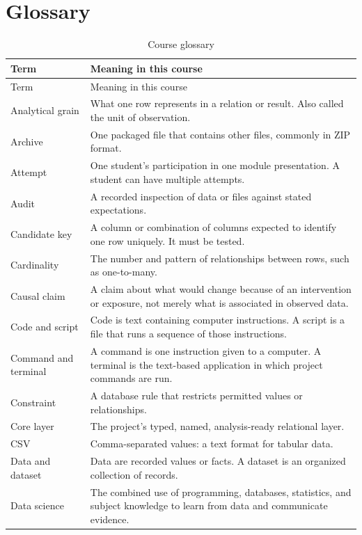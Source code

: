 \chapter{Glossary}
\label{ch:glossary}

\begin{longtable}{@{}p{}p{}@{}}
\caption{Course glossary}\label{tab:glossary}\\
\toprule
Term & Meaning in this course \\
\midrule
\endfirsthead
\toprule
Term & Meaning in this course \\
\midrule
\endhead
\bottomrule
\endfoot
Analytical grain &
What one row represents in a relation or result. Also called the unit of
observation. \\
Archive &
One packaged file that contains other files, commonly in ZIP format. \\
Attempt &
One student's participation in one module presentation. A student can have
multiple attempts. \\
Audit &
A recorded inspection of data or files against stated expectations. \\
Candidate key &
A column or combination of columns expected to identify one row uniquely. It
must be tested. \\
Cardinality &
The number and pattern of relationships between rows, such as one-to-many. \\
Causal claim &
A claim about what would change because of an intervention or exposure, not
merely what is associated in observed data. \\
Code and script &
Code is text containing computer instructions. A script is a file that runs a
sequence of those instructions. \\
Command and terminal &
A command is one instruction given to a computer. A terminal is the
text-based application in which project commands are run. \\
Constraint &
A database rule that restricts permitted values or relationships. \\
Core layer &
The project's typed, named, analysis-ready relational layer. \\
CSV &
Comma-separated values: a text format for tabular data. \\
Data and dataset &
Data are recorded values or facts. A dataset is an organized collection of
records. \\
Data science &
The combined use of programming, databases, statistics, and subject knowledge
to learn from data and communicate evidence. \\

\end{longtable}
